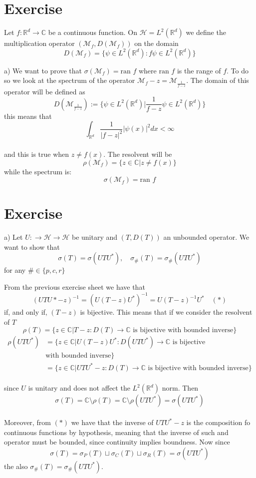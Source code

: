 \documentclass{article}
\newcommand{\R}{\mathbb{R}}
\newcommand{\C}{\mathbb{C}}
\newcommand{\M}{\mathcal{M}}
\begin{document}
\section{Exercise}
Let $f : \R^d \to \C$ be a continuous function. On $\mathcal{H} = L^2(\R^d)$ we define the multiplication operator $( \M_f, D(\M_f) )$ on the domain
\[
    D(\M_f) = \{ \psi \in L^2(\R^d) : f\psi \in L^2(\R^d) \}
\]

a) We want to prove that $\sigma(\M_f) = \mbox{ran }f$ where $\mbox{ran }f$ is the range of $f$. To do so we look at the spectrum of the operator $\M_f - z = \M_{\frac{1}{f-z}}$. The domain of this operator will be defined as 
\[
    D(\M_{\frac{1}{f-z}}) := \{ \psi \in L^2 (\R^d) | \frac{1}{f-z} \psi \in L^2(\R^d) \} 
\]
this means that \\
\[
    \int_{\R^d} \frac{1}{|f-z|^2} |\psi(x)|^2 dx < \infty
\]\\
and this is true when $z \neq f(x)$. The resolvent will be
\[
    \rho(\M_f) = \{ z\in \C | z \neq f(x) \}
\]
while the spectrum is:
\[
    \sigma(\M_f) = \mbox{ran }f
\]
\section{Exercise}
a) Let $U : \to \mathcal{H} \to \mathcal H $ be unitary and $(T, D(T))$ an unbounded operator. We want to show that 
\[
    \sigma(T) = \sigma(UTU^*), \quad \sigma_\#(T) = \sigma_\# (UTU^*)
\]
for any $\# \in \{ p,c,r \}$

From the previous exercise sheet we have that 
\[
    {(UTU* - z)}^{-1} = {(U(T-z)U^*)}^{-1} = U{(T-z)}^{-1} U^* \quad (*)
\]
if, and only if, $(T-z)$ is bijective. This means that if we consider the resolvent of $T$
\[
    \rho(T) = \{ z \in \C | T-z : D(T) \to \C \text{ is bijective with bounded inverse} \}
\]
\[
    \begin{split}
        \rho(UTU^*) &= \{ z \in \C | U(T-z)U^*  : D(UTU^*) \to \C 
        \text{ is bijective} \\
        & \text{with bounded inverse} \}\\
        &= \{ z \in \C | UTU^* -z  : D(T) \to \C \text{ is bijective with bounded inverse} \}
    \end{split}
\]\\
since $U$ is unitary and does not affect the $L^2(\R^d)$ norm. Then 
\[
    \sigma(T) = \C \setminus \rho(T)  = \C \setminus \rho({UTU^*}) = \sigma(UTU^*) 
\]\\
Moreover, from $(*)$ we have that the inverse of $UTU^* -z$ is the composition fo continuous functions by hypothesis, meaning that the inverse of such and operator must be bounded, since continuity implies boundness. Now since
\[
    \sigma (T) = \sigma_P(T) \sqcup  \sigma_C (T) \sqcup \sigma_R(T) = \sigma (UTU^*)
\]
the also $\sigma_{\#} (T) = \sigma_\# (UTU^*)$.
\end{document}
